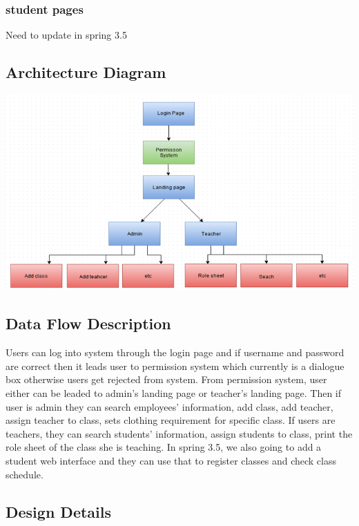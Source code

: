 \subsubsection{student pages}
Need to update in spring 3.5

\subsection{Architecture Diagram}
\includegraphics[scale=0.5]{pics/gui.png}\\

\subsection{Data Flow Description}
 Users can log into system through the login page and if username and password are correct then it leads user to permission system which currently is a dialogue box otherwise users get rejected from system. From permission system, user either can be leaded to admin's landing page or teacher's landing page. Then if user is admin they can search employees’ information, add class, add teacher, assign teacher to class, sets clothing requirement for specific class. If users are teachers, they can search students’ information, assign students to class, print the role sheet of the class she is teaching.
In spring 3.5, we also going to add a student web interface and they can use that to register classes and check class schedule. 

\subsection{Design Details}
